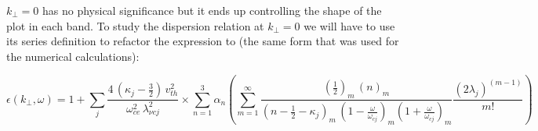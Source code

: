 \documentclass[12pt,a4paper]{article}
\begin{document}
    $k_\perp = 0$ has no physical significance but it ends up controlling the shape of the plot in each band. To study the dispersion relation at $k_\perp = 0$ we will have to use its series definition to refactor the expression to (the same form that was used for the numerical calculations):

    \begin{equation}
        \epsilon(k_\perp, \omega) = 1 + \sum_j \frac{4 \, (\kappa_j - \frac{3}{2}) \, v^2_{th}}{\omega^2_{ce} \, \lambda^2_{\nu c j}} \times \sum_{n = 1}^3 \alpha_n \left( \sum_{m = 1}^\infty \frac{ (\frac{1}{2})_m \, (n)_m }{(n - \frac{1}{2} - \kappa_j)_m \, (1 - \frac{\omega}{\omega_{cj}})_m (1 + \frac{\omega}{\omega_{cj}})_m } \frac{(2 \lambda_j)^{(m - 1)}}{m!} \right)
    \end{equation}
\end{document}
